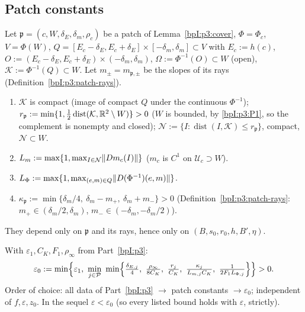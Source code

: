 \subsection{Patch constants}\label{bpI:p5:sec-patch}

Let $\mathfrak p=(c,W,\delta_E,\delta_m,\rho_c)$ be a patch of Lemma~\ref{bpI:p3:cover}, $\Phi=\Phi_c$, $V=\Phi(W)$, $Q=[E_c-\delta_E,E_c+\delta_E]\times[-\delta_m,\delta_m]\subset V$ with
$E_c:=h(c)$, $O:=(E_c-\delta_E,E_c+\delta_E)\times(-\delta_m,\delta_m)$, $\Omega:=\Phi^{-1}(O)\subset W$ (open), $\mathcal K:=\Phi^{-1}(Q)\subset W$. Let $m_\pm=m_{\mathfrak p,\pm}$ be the slopes of its rays
(Definition~\ref{bpI:p3:patch-rays}).

\begin{definition}\label{bpI:p5:patch-const}
\begin{enumerate}[label=(\alph*)]
\item $\mathcal K$ is compact (image of compact $Q$ under the continuous $\Phi^{-1}$); $r_{\mathfrak p}:=\min\{1,\tfrac12\operatorname{dist}(\mathcal K,\mathbb{R}^2\setminus W)\}>0$ ($W$ is bounded, by \ref{bpI:p3:P1}, so the complement is nonempty and closed);
$\mathcal N:=\{I:\operatorname{dist}(I,\mathcal K)\le r_{\mathfrak p}\}$, compact, $\mathcal N\subset W$.
\item $L_m:=\max\{1,\max_{I\in\mathcal N}\lVert Dm_c(I)\rVert\}$ ($m_c$ is $C^1$ on $\mathcal U_c\supset W$).
\item $L_\Phi:=\max\{1,\max_{(e,m)\in Q}\lVert D(\Phi^{-1})(e,m)\rVert\}$.
\item $\kappa_{\mathfrak p}:=\min\{\delta_m/4,\ \delta_m-m_+,\ \delta_m+m_-\}>0$ (Definition~\ref{bpI:p3:patch-rays}: $m_+\in(\delta_m/2,\delta_m)$, $m_-\in(-\delta_m,-\delta_m/2)$).
\end{enumerate}
They depend only on $\mathfrak p$ and its rays, hence only on $(B,s_0,r_0,h,B',\eta)$.
\end{definition}

\begin{definition}\label{bpI:p5:eps0}
With $\varepsilon_1,C_K,F_1,\rho_\infty$ from Part~\ref{bpI:p3}:
\[
\varepsilon_0:=\min\Bigl\{\varepsilon_1,\ \min_{j\in\mathcal P}\ \min\Bigl\{\tfrac{\delta_{E,j}}4,\ \tfrac{\rho_\infty}{8C_K},\ \tfrac{r_j}{C_K},\ \tfrac{\kappa_j}{L_{m,j}C_K},\ \tfrac1{2F_1L_{\Phi,j}}\Bigr\}\Bigr\}>0 .
\]
Order of choice: all data of Part~\ref{bpI:p3} $\to$ patch constants $\to\varepsilon_0$; independent of $f,\varepsilon,z_0$. In the sequel $\varepsilon<\varepsilon_0$ (so every listed bound holds with $\varepsilon$, strictly).
\end{definition}

